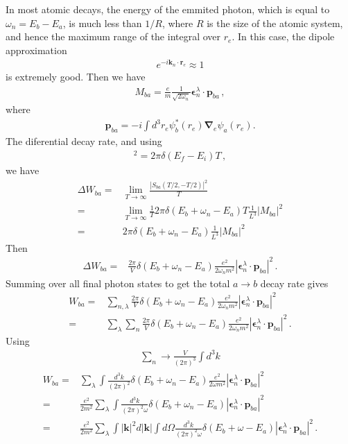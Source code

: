 In most atomic decays, the energy of the emmited photon, which is equal to $\omega_n=E_b-E_a$, is much less than $1/R$, where $R$ is the
size of the atomic system, and hence the maximum range of the integral over $r_e$. In this case, the dipole approximation 
\begin{align}
  e^{-i\mathbf{k}_n\cdot\mathbf{r}_e}\approx1
\end{align}
is extremely good. Then we have
\begin{align}
  M_{ba}=\frac{e}{m}\frac{1}{\sqrt{2\omega_n}}\boldsymbol{\epsilon}^{\lambda}_{n}\cdot\mathbf{p}_{ba}\,,
\end{align}
where
\begin{align}
  \mathbf{p}_{ba}=-i\int d^3r_e \psi_b^*(r_e)\boldsymbol{\nabla}_e\psi_a(r_e).
\end{align}
The diferential decay rate, and using
\begin{align}
  [2\pi \delta(E_f-E_i)]^2=2\pi \delta(E_f-E_i) T \,,
\end{align}
we have
\begin{align}
  \Delta W_{ba}=&\lim_{T\to \infty}\frac{|S_{ba}(T/2,-T/2)|^2}{T}\nonumber\\
  =&\lim_{T\to \infty}\frac{1}{T}2\pi \delta(E_b+\omega_n-E_a) T \frac{1}{L^3}|M_{ba}|^2\nonumber\\
  =&2\pi\delta(E_b+\omega_n-E_a)\frac{1}{L^3}|M_{ba}|^2
\end{align}
Then
\begin{align}
  \Delta W_{ba}=&\frac{2\pi}{V}\delta(E_b+\omega_n-E_a)\frac{e^2}{2\omega_n m^2}|\boldsymbol{\epsilon}^{\lambda}_{n}\cdot\mathbf{p}_{ba}|^2\,.
\end{align}
Summing over all final photon states to get the total $a\to b$ decay rate gives
\begin{align}
  W_{ba}=&\sum_{n,\lambda}\frac{2\pi}{V}\delta(E_b+\omega_n-E_a)\frac{e^2}{2\omega_n m^2}|\boldsymbol{\epsilon}^{\lambda}_{n}\cdot\mathbf{p}_{ba}|^2\nonumber\\
  =&\sum_{\lambda}\sum_n\frac{2\pi}{V}\delta(E_b+\omega_n-E_a)\frac{e^2}{2\omega_n m^2}|\boldsymbol{\epsilon}^{\lambda}_{n}\cdot\mathbf{p}_{ba}|^2\,.
\end{align}
Using
\begin{align}
  \sum_n\to \frac{V}{(2\pi)^3}\int d^3k
\end{align}
\begin{align}
   W_{ba}=&\sum_{\lambda}\int\frac{d^3k}{(2\pi)^2}\delta(E_b+\omega_n-E_a)\frac{e^2}{2\omega m^2}|\boldsymbol{\epsilon}^{\lambda}_{n}\cdot\mathbf{p}_{ba}|^2\nonumber\\
=&\frac{e^2}{2m^2}\sum_{\lambda}\int\frac{d^3k}{(2\pi)^2\omega}\delta(E_b+\omega_n-E_a)|\boldsymbol{\epsilon}^{\lambda}_{n}\cdot\mathbf{p}_{ba}|^2\nonumber\\
=&\frac{e^2}{2m^2}\sum_{\lambda}\int|\mathbf{k}|^2d|\mathbf{k}|\int d\Omega\frac{d^3k}{(2\pi)^2\omega}\delta(E_b+\omega-E_a)|\boldsymbol{\epsilon}^{\lambda}_{n}\cdot\mathbf{p}_{ba}|^2\,.
\end{align}
